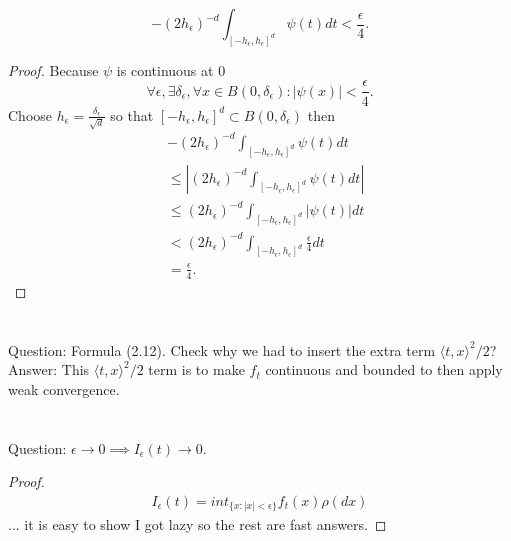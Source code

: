 \documentclass[a4paper,11pt]{article}
\begin{document}
\begin{equation}
    - ( 2 h_{\epsilon} )^{-d} \int_{[-h_{\epsilon}, h_{\epsilon} ]^{d}} \psi( t ) d t < \frac{\epsilon}{4}.
\end{equation}

\begin{proof}
    Because $\psi$ is continuous at $0$
    \begin{equation}
        \forall \epsilon, \exists \delta_{\epsilon}, \forall x \in B(0, \delta_{\epsilon}): |\psi(x)|<\frac{\epsilon}{4}
        .
    \end{equation}
    Choose $h_{\epsilon} = \frac{\delta_{\epsilon}}{\sqrt{d}}$ so that $[-h_{\epsilon},h_{\epsilon}]^{d} \subset B(0, \delta_{\epsilon})  $  then
    \begin{align}
         & -( 2 h_{\epsilon} )^{-d} \int_{[-h_{\epsilon}, h_{\epsilon} ]^{d}} \psi( t ) d t                   \\
         & \le \left|( 2 h_{\epsilon} )^{-d} \int_{[-h_{\epsilon}, h_{\epsilon} ]^{d}} \psi( t ) d t  \right| \\
         & \le ( 2 h_{\epsilon} )^{-d} \int_{[-h_{\epsilon}, h_{\epsilon} ]^{d}} \left|\psi( t )\right| d t   \\
         & < ( 2 h_{\epsilon} )^{-d} \int_{[-h_{\epsilon}, h_{\epsilon} ]^{d}} \frac{\epsilon}{4}d t          \\
         & = \frac{\epsilon}{4}.
    \end{align}
\end{proof}

\section{}
Question:  Formula (2.12). Check why we had to insert the extra term $ \langle t, x \rangle^{2} / 2 $? \\
Answer: This $ \langle t, x \rangle^{2} / 2 $ term is to make $f_t$ continuous and bounded to then apply weak convergence.

\section{}
Question: $ \epsilon \rightarrow 0 \implies I_{\epsilon}(t) \rightarrow 0$. \\
\begin{proof}
    \begin{align}
        I_{\epsilon}(t) = int_{\{x : | x | < \epsilon\}} f_{t} ( x ) \rho( d x )
    \end{align}
    ... it is easy to show I got lazy so the rest are fast answers.

\end{proof}
\end{document}
